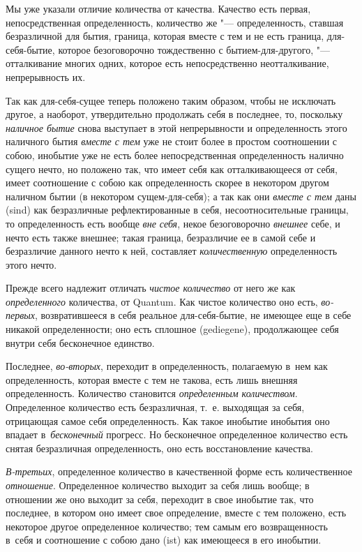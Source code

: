 Мы уже указали отличие количества от качества. Качество есть первая,
непосредственная определенность, количество же "--- определенность, ставшая
безразличной для бытия, граница, которая вместе с тем и не есть граница,
для-себя-бытие, которое безоговорочно тождественно с бытием-для-другого,
"--- отталкивание многих одних, которое есть непосредственно
неотталкивание, непрерывность их.

Так как для-себя-сущее теперь положено таким образом, чтобы не исключать
другое, а наоборот, утвердительно продолжать себя в последнее, то, поскольку
{\em наличное бытие} снова выступает в этой непрерывности и определенность
этого наличного бытия {\em вместе с тем} уже не стоит более в простом
соотношении с собою, инобытие уже не есть более непосредственная определенность
налично сущего нечто, но положено так, что имеет себя как отталкивающееся от
себя, имеет соотношение с собою как определенность скорее в некотором другом
наличном бытии (в некотором сущем-для-себя); а так как они {\em вместе с тем}
даны (sind) как безразличные рефлектированные в себя, несоотносительные
границы, то определенность есть вообще {\em вне себя}, некое безоговорочно
{\em внешнее} себе, и нечто есть также внешнее; такая граница, безразличие ее
в самой себе и безразличие данного нечто к ней, составляет {\em количественную}
определенность этого нечто.

Прежде всего надлежит отличать {\em чистое количество} от него же как
{\em определенного} количества, от Quantum. Как чистое количество оно есть,
{\em во-первых}, возвратившееся в себя реальное для-себя-бытие, не имеющее еще
в себе никакой определенности; оно есть сплошное (gediegene), продолжающее себя
внутри себя бесконечное единство.

Последнее, {\em во-вторых}, переходит в определенность, полагаемую в~нем как
определенность, которая вместе с тем не такова, есть лишь внешняя
определенность. Количество становится {\em определенным количеством}.
Определенное количество есть безразличная, т.~е. выходящая за себя, отрицающая
самое себя определенность. Как такое инобытие инобытия оно впадает
в~{\em бесконечный} прогресс. Но бесконечное определенное количество есть
снятая безразличная определенность, оно есть восстановление качества.

{\em В-третьих}, определенное количество в качественной форме есть
количественное {\em отношение}. Определенное количество выходит за себя лишь
вообще; в отношении же оно выходит за себя, переходит в свое инобытие так, что
последнее, в котором оно имеет свое определение, вместе с тем положено, есть
некоторое другое определенное количество; тем самым его возвращенность в~себя
и соотношение с собою дано (ist) как имеющееся в его инобытии.

